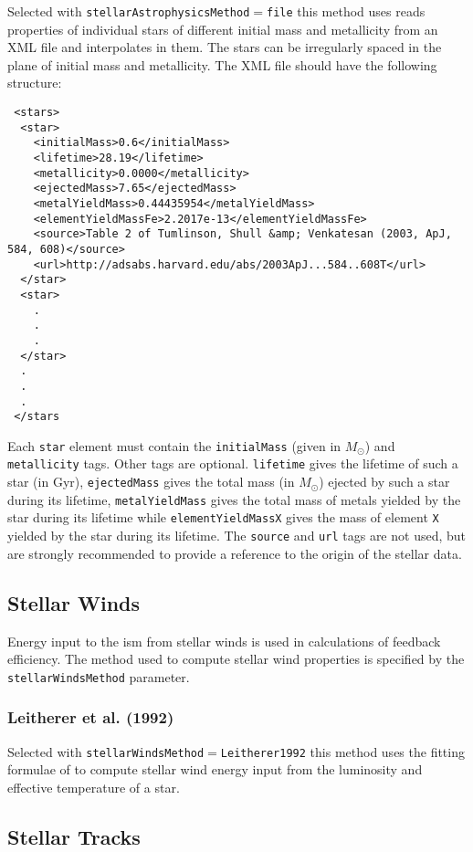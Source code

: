 Selected with {\tt stellarAstrophysicsMethod}$=${\tt file} this method uses reads properties of individual stars of different initial mass and metallicity from an XML file and interpolates in them. The stars can be irregularly spaced in the plane of initial mass and metallicity. The XML file should have the following structure:
\begin{verbatim}
 <stars>
  <star>
    <initialMass>0.6</initialMass>
    <lifetime>28.19</lifetime>
    <metallicity>0.0000</metallicity>
    <ejectedMass>7.65</ejectedMass>
    <metalYieldMass>0.44435954</metalYieldMass>
    <elementYieldMassFe>2.2017e-13</elementYieldMassFe>
    <source>Table 2 of Tumlinson, Shull &amp; Venkatesan (2003, ApJ, 584, 608)</source>
    <url>http://adsabs.harvard.edu/abs/2003ApJ...584..608T</url>
  </star>
  <star>
    .
    .
    .
  </star>
  .
  .
  .
 </stars
\end{verbatim}
Each {\tt star} element must contain the {\tt initialMass} (given in $M_\odot$) and {\tt metallicity} tags. Other tags are optional. {\tt lifetime} gives the lifetime of such a star (in Gyr), {\tt ejectedMass} gives the total mass (in $M_\odot$) ejected by such a star during its lifetime, {\tt metalYieldMass} gives the total mass of metals yielded by the star during its lifetime while {\tt elementYieldMassX} gives the mass of element {\tt X} yielded by the star during its lifetime. The {\tt source} and {\tt url} tags are not used, but are strongly recommended to provide a reference to the origin of the stellar data.

\subsection{Stellar Winds}

Energy input to the \gls{ism} from stellar winds is used in calculations of feedback efficiency. The method used to compute stellar wind properties is specified by the {\tt stellarWindsMethod} parameter.

\subsubsection{Leitherer et al. (1992)}

Selected with {\tt stellarWindsMethod}$=${\tt Leitherer1992} this method uses the fitting formulae of \cite{leitherer_deposition_1992} to compute stellar wind energy input from the luminosity and effective temperature of a star.

\subsection{Stellar Tracks}

